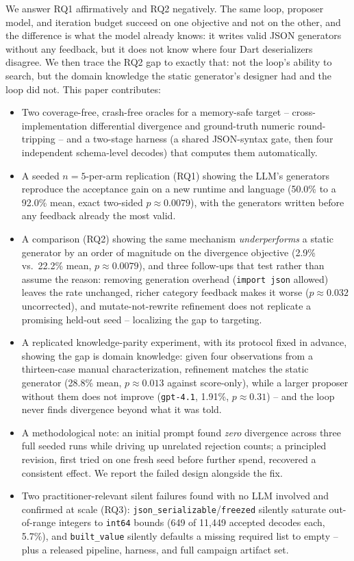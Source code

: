 We answer RQ1 affirmatively and RQ2 negatively. The same loop, proposer
model, and iteration budget succeed on one objective and not on the other,
and the difference is what the model already knows: it writes valid JSON
generators without any feedback, but it does not know where four Dart
deserializers disagree. We then trace the RQ2 gap to exactly that: not the
loop's ability to search, but the domain knowledge the static generator's
designer had and the loop did not. This paper contributes:

\begin{itemize}
  \item Two coverage-free, crash-free oracles for a memory-safe target --
    cross-implementation differential divergence and ground-truth numeric
    round-tripping -- and a two-stage harness (a shared JSON-syntax gate,
    then four independent schema-level decodes) that computes them
    automatically.
  \item A seeded $n{=}5$-per-arm replication (RQ1) showing the LLM's
    generators reproduce the acceptance gain on a new runtime and language
    (50.0\% to a 92.0\% mean, exact two-sided $p \approx 0.0079$), with
    the generators written before any feedback already the most valid.
  \item A comparison (RQ2) showing the same mechanism \emph{underperforms} a
    static generator by an order of magnitude on the divergence objective
    (2.9\% vs.\ 22.2\% mean, $p \approx 0.0079$), and three follow-ups that
    test rather than assume the reason: removing generation overhead
    (\texttt{import json} allowed) leaves the rate unchanged, richer
    category feedback makes it worse ($p \approx 0.032$ uncorrected), and
    mutate-not-rewrite refinement does not replicate a promising held-out
    seed -- localizing the gap to targeting.
  \item A replicated knowledge-parity experiment, with its protocol fixed in advance, showing the
    gap is domain knowledge: given four observations from a thirteen-case
    manual characterization, refinement matches the static generator
    (28.8\% mean, $p \approx 0.013$ against score-only), while a larger
    proposer without them does not improve (\texttt{gpt-4.1}, 1.91\%,
    $p \approx 0.31$) -- and the loop never finds divergence beyond what it
    was told.
  \item A methodological note: an initial prompt found \emph{zero}
    divergence across three full seeded runs while driving up unrelated
    rejection counts; a principled revision, first tried on one fresh seed
    before further spend, recovered a consistent effect. We report the
    failed design alongside the fix.
  \item Two practitioner-relevant silent failures found with no LLM involved and
    confirmed at scale (RQ3): \texttt{json\_serializable}/\texttt{freezed}
    silently saturate out-of-range integers to \texttt{int64} bounds (649 of
    11{,}449 accepted decodes each, 5.7\%), and \texttt{built\_value} silently
    defaults a missing required list to empty -- plus a released pipeline,
    harness, and full campaign artifact set.
\end{itemize}
